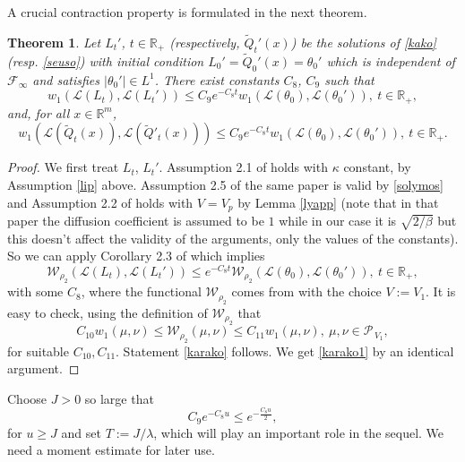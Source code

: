 \documentclass[a4paper,draft]{article}
\newtheorem{theorem}{Theorem}[section]
\begin{document}
A crucial contraction property is formulated in the next theorem.

\begin{theorem}\label{contra} Let $L_t'$,
$t\in\mathbb{R}_+$ (respectively, $\tilde{Q}_t'(x)$)
be the solutions of
\eqref{kako} (resp. \eqref{seuso})
with initial condition $L_0'=\tilde{Q}_0'(x)=\theta_0'$ which is independent of $\mathcal{F}_{\infty}$
and satisfies $|\theta_0'|\in L^1$. There exist constants $C_8$, $C_9$
such that
\begin{equation}\label{karako}
w_1(\mathcal{L}(L_t),\mathcal{L}(L_t'))\leq C_9 e^{-C_8 t}
w_1(\mathcal{L}(\theta_0),\mathcal{L}(\theta_0')),\ t\in\mathbb{R}_+,
\end{equation}
and, for all $x\in\mathbb{R}^m$,
\begin{equation}\label{karako1}
w_1(\mathcal{L}(\tilde{Q}_t(x)),\mathcal{L}(\tilde{Q}'_t(x)))\leq C_9 e^{-C_8 t}
w_1(\mathcal{L}(\theta_0),\mathcal{L}(\theta_0')),\ t\in\mathbb{R}_+.
\end{equation}
\end{theorem}
\begin{proof}  
We first treat $L_t$, $L_t'$.
Assumption 2.1 of \cite{eberle} holds with $\kappa$ constant,
by Assumption \ref{lip} above. Assumption 2.5 of the same paper is valid
by \eqref{solymos} and Assumption 2.2 of \cite{eberle} holds with $V=V_p$ by Lemma
\ref{lyapp} (note that in that paper
the diffusion coefficient is assumed to be $1$ while in our case it is $\sqrt{2/\beta}$
but this doesn't affect the validity of the arguments, only the values of the constants). 
So we can apply Corollary 2.3 of \cite{eberle} which implies
$$
\mathcal{W}_{\rho_2}
(\mathcal{L}(L_t),\mathcal{L}(L_t'))\leq e^{-C_8 t}
\mathcal{W}_{\rho_2}(\mathcal{L}(\theta_0),\mathcal{L}(\theta_0')),\ t\in\mathbb{R}_+,
$$
with some $C_8$, where the functional 
$\mathcal{W}_{\rho_2}$ comes from \cite{eberle} with the choice $V:=V_1$.
It is easy to check, using the definition of $\mathcal{W}_{\rho_2}$ that
$$
C_{10} w_1(\mu,\nu)\leq
\mathcal{W}_{\rho_2}
(\mu,\nu)\leq C_{11} w_1(\mu,\nu),\ \mu,\nu\in\mathcal{P}_{\, V_1},
$$
for suitable $C_{10},C_{11}$. Statement \eqref{karako} follows. We get \eqref{karako1} by
an identical argument.
\end{proof}

Choose $J>0$ so large that 
\begin{equation}\label{bartoli}
C_9 e^{-C_8 u}\leq e^{-\frac{C_8 u}{2}},
\end{equation} 
for $u\geq J$ and set $T:=J/{\lambda}$, which will play an important role
in the sequel.
We need a moment estimate for later use.
\end{document}

